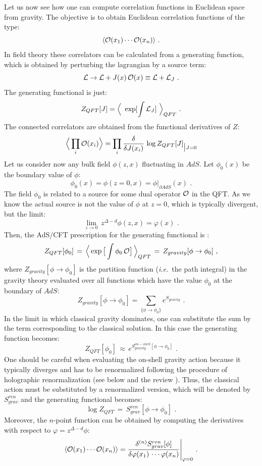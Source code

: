 \documentclass[12pt,notitlepage,a4paper]{article}
\newcommand{\beq}{\begin{equation}}
\newcommand{\eeq}{\end{equation}}
\def\ie{{\emph{i.e.}}}
\begin{document}
Let us now see how one can compute correlation functions in Euclidean space from gravity. The objective is to obtain Euclidean correlation functions of the type:
 \beq
\langle {\cal O}(x_1)\cdots {\cal O}(x_n)\rangle\,\,.
\eeq
In field theory these correlators can be calculated from a generating function, which is 
obtained by perturbing the lagrangian by a source term:
\beq
{\cal L}\to {\cal L}+J(x)\,{\cal O}(x)\equiv {\cal L}+{\cal L}_J\,\,.
\eeq
The generating functional is just:
\beq
Z_{QFT}[J]=\Big\langle\,\, \exp[\int {\cal L}_J]\,\,\Big\rangle_{QFT}\,\,.
\eeq
The connected correlators are obtained from the functional derivatives of $Z$:
\beq
\Big\langle \prod_{i}{\cal O}(x_i)\Big\rangle=
 \prod_{i} {\delta\over \delta J(x_i)}\,\log Z_{QFT}[J]_{\big|J=0}
 \eeq
Let us consider now  any bulk field $\phi(z,x)$  fluctuating in $AdS$. Let $\phi_0(x)$ be the boundary value of $\phi$:
\beq
\phi_0(x)=\phi(z=0,x)=\phi |_{\partial AdS}(x)\,\,.
\eeq
The field $\phi_0$ is   related to a source for some dual operator ${\cal O}$ in the QFT. As we know the actual source is not the value of $\phi$ at $z=0$, which is typically divergent, but the limit:
\beq
\lim_{z\to 0}\,z^{\Delta-d}\phi(z,x)=\varphi(x)\,\,.
\label{renor-field}
\eeq
Then, the  AdS/CFT prescription for the generating functional is \cite{Gubser:1998bc,Witten:1998qj}:
\beq
Z_{QFT}[\phi_0]\,=\,
\Big\langle \exp\big[\int \phi_0\, {\cal O}\big]\,\Big\rangle_{QFT}\,=\,
Z_{gravity} [\phi\to \phi_0]\,\,,
\eeq
where $Z_{gravity} [\phi\to \phi_0]$ is the partition function (\ie\ the path integral) in the gravity theory evaluated over all functions  which have the value $\phi_0$ at the boundary of $AdS$:
\beq
Z_{gravity} [\phi\to \phi_0]=\sum_{\{\phi\to \phi_0\}} e^{S_{gravity}}\,\,.
\eeq
In the limit in which classical gravity dominates, one can substitute the sum by the term corresponding to the classical solution. In this case the generating function becomes:
\beq
Z_{QFT}[\phi_0]\,\approx\,
e^{S_{gravity}^{on-shell}[\phi\to\phi_0]}\,\,.
\eeq
One should be careful when evaluating the on-shell gravity action because it typically diverges and has to be renormalized following the procedure of holographic renormalization \cite{Henningson:1998gx,deHaro:2000xn} (see below and  the review \cite{Skenderis:2002wp}). Thus, the classical action must be substituted by a renormalized version, which will be denoted by $S_{grav}^{ren}$ and the generating functional becomes:
\beq
\log Z_{QFT}\,=\,S_{grav}^{ren}[\phi\to\phi_0]\,\,.
\eeq
Moreover, the $n$-point function can be obtained by computing the derivatives with respect to $\varphi=z^{\Delta-d}\phi$:
\beq
\langle {\cal O}(x_1)\cdots {\cal O}(x_n)\rangle=
{\delta^{(n)} S_{grav}^{ren}[\phi]\over \delta\varphi(x_1)\,\cdots \varphi(x_n)}\Bigg|_{\varphi=0}\,\,.
\eeq
\end{document}
